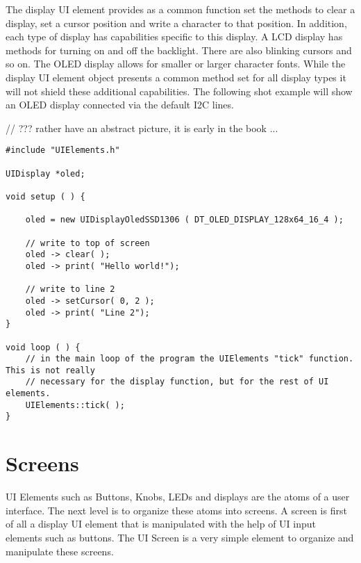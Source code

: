 The display UI element provides as a common function set the methods to clear a display, set a cursor position and write a character to that position. In addition, each type of display has capabilities specific to this display. A LCD display has methods for turning on and off the backlight. There are also blinking cursors and so on. The OLED display allows for smaller or larger character fonts. While the display UI element object presents a common method set for all display types it will not shield these additional capabilities. The following shot example will show an OLED display connected via the default I2C lines.

// ??? rather have an abstract picture, it is early in the book ...


\lstset{language=c++, style=codesnippetstyle}
\begin{lstlisting}
#include "UIElements.h"

UIDisplay *oled;

void setup ( ) {

	oled = new UIDisplayOledSSD1306 ( DT_OLED_DISPLAY_128x64_16_4 );

	// write to top of screen
	oled -> clear( );
	oled -> print( "Hello world!");

	// write to line 2
	oled -> setCursor( 0, 2 );
	oled -> print( "Line 2");
}

void loop ( ) {
	// in the main loop of the program the UIElements "tick" function. This is not really
	// necessary for the display function, but for the rest of UI elements.
	UIElements::tick( );
}
\end{lstlisting}
\FloatBarrier

\section{Screens}

UI Elements such as Buttons, Knobs, LEDs and displays are the atoms of a user interface. The next level is to organize these atoms into screens. A screen is first of all a display UI element that is manipulated with the help of UI input elements such as buttons. The UI Screen is a very simple element to organize and manipulate these screens.

